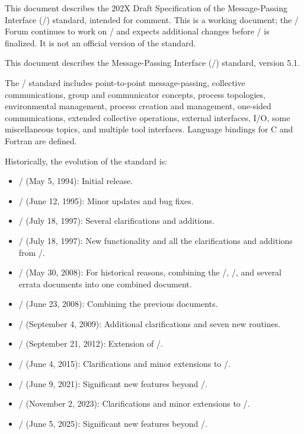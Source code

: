 \ifdraftspec
   This document describes the 202X Draft Specification of the
   Message-Passing Interface
   (\mpi/) standard, intended for comment.
   This is a working document; the \MPI/ Forum continues to work on
   \mpivdoti/ and expects additional changes before \mpivdoti/ is
   finalized.
   It is not an official version of the standard.\par
\else
\fi
   This document describes the Message-Passing Interface (\mpi/)
   standard, version 5.1.

   The \mpi/ standard includes point-to-point message-passing,
   collective communications, group and communicator concepts,
   process topologies, environmental management,
   process creation and management, one-sided communications,
   extended collective operations, external interfaces, I/O,
   some miscellaneous topics, and multiple tool interfaces.
   Language bindings for C and Fortran are defined.

Historically, the evolution of the standard is:
\begin{itemize}
\item \MPIIDOTO/ (May 5, 1994): Initial release.
\item \MPIIDOTI/ (June 12, 1995): Minor updates and bug fixes.
\item \MPIIDOTII/ (July 18, 1997): Several clarifications and additions.
\item \MPIIIDOTO/ (July 18, 1997): New functionality and all the
      clarifications and additions from \MPIIDOTII/.
\item \MPIIDOTIII/ (May 30, 2008): For historical reasons, combining the
      \MPIIDOTI/, \MPIIDOTII/, and several errata documents into one combined
       document.
\item \MPIIIDOTI/ (June 23, 2008): Combining the previous documents.
\item \MPIIIDOTII/ (September 4, 2009): Additional clarifications and seven
       new routines.
\item \MPIIIIDOTO/ (September 21, 2012): Extension of \MPIIIDOTII/.
\item \MPIIIIDOTI/ (June 4, 2015): Clarifications and minor extensions to
      \MPIIIIDOTO/.
\item \MPIIVDOTO/ (June 9, 2021): Significant new features beyond \MPIIIIDOTI/.
\item \MPIIVDOTI/ (November 2, 2023): Clarifications and minor extensions
to \MPIIVDOTO/.
\item \MPIVDOTO/ (June 5, 2025): Significant new features beyond \MPIIVDOTI/.
\end{itemize}

